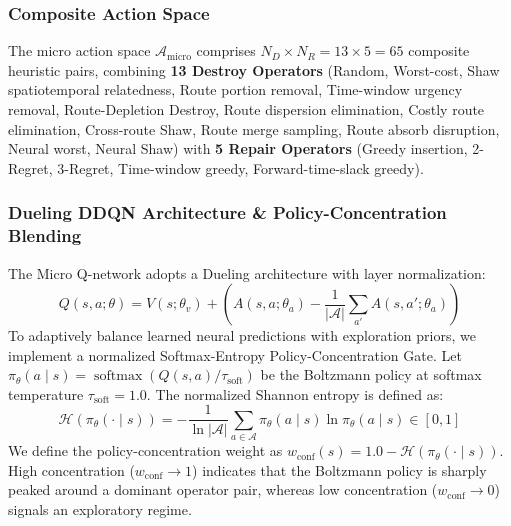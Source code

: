 \documentclass{ieeeaccess}
\begin{document}
\subsubsection{Composite Action Space}
The micro action space $\mathcal{A}_{\text{micro}}$ comprises $N_D \times N_R = 13 \times 5 = 65$ composite heuristic pairs, combining \textbf{13 Destroy Operators} (Random, Worst-cost, Shaw spatiotemporal relatedness, Route portion removal, Time-window urgency removal, Route-Depletion Destroy, Route dispersion elimination, Costly route elimination, Cross-route Shaw, Route merge sampling, Route absorb disruption, Neural worst, Neural Shaw) with \textbf{5 Repair Operators} (Greedy insertion, 2-Regret, 3-Regret, Time-window greedy, Forward-time-slack greedy).

\subsubsection{Dueling DDQN Architecture \& Policy-Concentration Blending}
The Micro Q-network adopts a Dueling architecture \cite{wang2016dueling} with layer normalization:
\begin{equation}
  Q(s, a; \theta) = V(s; \theta_v) + \left( A(s, a; \theta_a) - \frac{1}{|\mathcal{A}|} \sum_{a'} A(s, a'; \theta_a) \right)
  \label{eq:dueling_q}
\end{equation}
To adaptively balance learned neural predictions with exploration priors, we implement a normalized Softmax-Entropy Policy-Concentration Gate. Let $\pi_{\theta}(a \mid s) = \operatorname{softmax}(Q(s, a)/\tau_{\text{soft}})$ be the Boltzmann policy at softmax temperature $\tau_{\text{soft}} = 1.0$. The normalized Shannon entropy is defined as:
\begin{equation}
  \mathcal{H}(\pi_{\theta}(\cdot \mid s)) = -\frac{1}{\ln |\mathcal{A}|} \sum_{a \in \mathcal{A}} \pi_{\theta}(a \mid s) \ln \pi_{\theta}(a \mid s) \in [0, 1]
  \label{eq:policy_entropy}
\end{equation}
We define the policy-concentration weight as $w_{\text{conf}}(s) = 1.0 - \mathcal{H}(\pi_{\theta}(\cdot \mid s))$. High concentration ($w_{\text{conf}} \to 1$) indicates that the Boltzmann policy is sharply peaked around a dominant operator pair, whereas low concentration ($w_{\text{conf}} \to 0$) signals an exploratory regime. 
\end{document}
